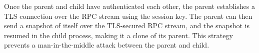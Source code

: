 Once the parent and child have authenticated each other, the parent establishes a TLS connection over the RPC stream using the session key.
The parent can then send a snapshot of itself over
the TLS-secured RPC stream, and the snapshot is resumed in the child process, making it a clone of its parent.
This strategy
prevents a man-in-the-middle attack between the parent and child.









